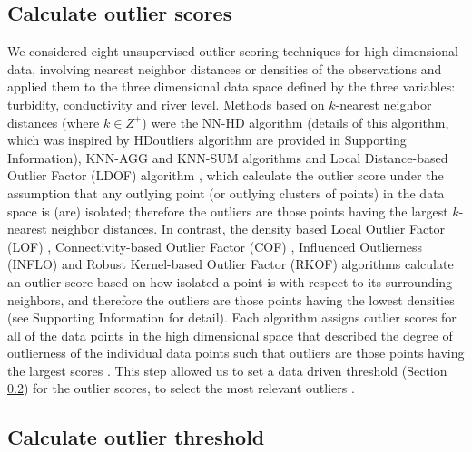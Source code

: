 \documentclass[draft]{agujournal2018} %
\begin{document}
\subsection{Calculate outlier scores}\label{sec:outscore}

We considered eight unsupervised outlier scoring techniques for high
dimensional data, involving nearest neighbor distances or densities of
the observations \color{black} and applied them to the three dimensional data space defined by the three variables: turbidity, conductivity and river level. \color{black} Methods based on \(k\)-nearest neighbor distances
(where \(k \in Z^{+}\)) were the \color{black}  NN-HD algorithm (details of this algorithm, which was inspired by HDoutliers algorithm \citep{wilkinsonvisualizing} are provided in Supporting Information), \color{black}  KNN-AGG and KNN-SUM algorithms
\citep{angiulli2002fast,madsen2018ddoutlier} and Local Distance-based
Outlier Factor (LDOF) algorithm \citep{zhang2009new}, which calculate
the outlier score under the assumption that any outlying point (or
outlying clusters of points) in the data space is (are) isolated;
therefore the outliers are those points having the largest \(k\)-nearest
neighbor distances. In contrast, the density based Local Outlier Factor
(LOF) \citep{breunig2000lof}, Connectivity-based Outlier Factor (COF)
\citep{tang2002enhancing}, Influenced Outlierness (INFLO)
\citep{jin2006ranking} and Robust Kernel-based Outlier Factor (RKOF)
\citep{gao2011rkof} algorithms calculate an outlier score based on
how isolated a point is with respect to its surrounding neighbors, and
therefore the outliers are those points having the lowest densities (see
Supporting Information for detail). Each algorithm assigns outlier scores for all of the
data points in the high dimensional space that described the degree of
outlierness of the individual data points such that outliers are those
points having the largest scores
\citep{kriegel2010outlier,shahid2015characteristics}. This step
allowed us to set a \color{black} data driven threshold (Section
\ref{sec:thresholdcalc}) for the outlier scores, to select the most relevant outliers
\citep{chandola2009anomaly}.
\color{black}

\subsection{Calculate outlier threshold}\label{sec:thresholdcalc}
\end{document}
